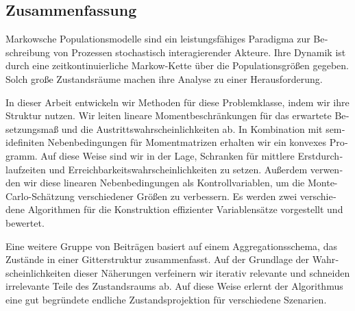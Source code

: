 \begin{otherlanguage}{ngerman}
\chapter*{Zusammenfassung}
Markowsche Populationsmodelle sind ein leistungsfähiges Paradigma zur Beschreibung von Prozessen stochastisch interagierender Akteure. Ihre Dynamik ist durch eine zeitkontinuierliche Markow-Kette über die Populationsgrößen gegeben. Solch große Zustandsräume machen ihre Analyse zu einer Herausforderung.

In dieser Arbeit entwickeln wir Methoden für diese Problemklasse, indem wir ihre Struktur nutzen. Wir leiten lineare Momentbeschränkungen für das erwartete Besetzungsmaß und die Austrittswahrscheinlichkeiten ab. In Kombination mit semidefiniten Nebenbedingungen für Momentmatrizen erhalten wir ein konvexes Programm. Auf diese Weise sind wir in der Lage, Schranken für mittlere Erstdurchlaufzeiten und Erreichbarkeitswahrscheinlichkeiten zu setzen. Außerdem verwenden wir diese linearen Nebenbedingungen als Kontrollvariablen, um die Monte-Carlo-Schätzung verschiedener Größen zu verbessern. Es werden zwei verschiedene Algorithmen für die Konstruktion effizienter Variablensätze vorgestellt und bewertet.

Eine weitere Gruppe von Beiträgen basiert auf einem Aggregationsschema, das Zustände in einer Gitterstruktur zusammenfasst. Auf der Grundlage der Wahrscheinlichkeiten dieser Näherungen verfeinern wir iterativ relevante und schneiden irrelevante Teile des Zustandsraums ab. Auf diese Weise erlernt der Algorithmus eine gut begründete endliche Zustandsprojektion für verschiedene Szenarien.
\end{otherlanguage}


\vfill
